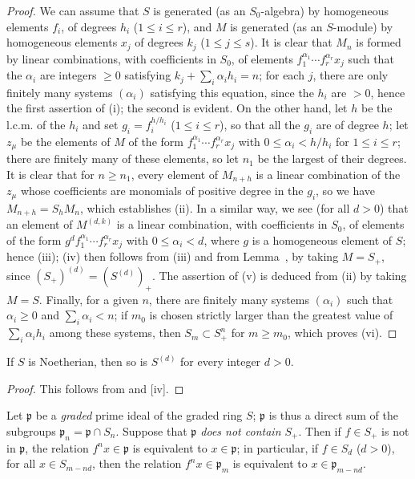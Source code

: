 \begin{proof}
We can assume that $S$ is generated (as an $S_0$-algebra) by homogeneous elements $f_i$, of degrees $h_i$ ($1\leq i\leq r$), and $M$ is generated (as an $S$-module) by homogeneous elements $x_j$ of degrees $k_j$ ($1\leq j\leq s$).
It is clear that $M_n$ is formed by linear combinations,
with coefficients in $S_0$, of elements $f_1^{\alpha_1}\cdots f_r^{\alpha_r}x_j$ such that the $\alpha_i$ are integers $\geq 0$ satisfying $k_j+\sum_i\alpha_i h_i=n$;
for each $j$, there are only finitely many systems $(\alpha_i)$ satisfying this equation, since the $h_i$ are $>0$, hence the first assertion of (i);
the second is evident.
On the other hand, let $h$ be the l.c.m. of the $h_i$ and set $g_i=f_i^{h/h_i}$ ($1\leq i\leq r$), so that all the $g_i$ are of degree $h$;
let $z_\mu$ be the elements of $M$ of the form $f_1^{\alpha_1}\cdots f_r^{\alpha_r}x_j$ with $0\leq\alpha_i<h/h_i$ for $1\leq i\leq r$;
there are finitely many of these elements, so let $n_1$ be the largest of their degrees.
It is clear that for $n\geq n_1$, every element of $M_{n+h}$ is a linear combination of the $z_\mu$ whose coefficients are monomials of positive degree in the $g_i$, so we have $M_{n+h}=S_h M_n$, which establishes (ii).
In a similar way, we see (for all $d>0$) that an element of $M^{(d,k)}$ is a linear combination, with coefficients in $S_0$, of elements of the form $g^d f_1^{\alpha_1}\cdots f_r^{\alpha_r}x_j$ with $0\leq\alpha_i<d$, where $g$ is a homogeneous element of $S$;
hence (iii);
(iv) then follows from (iii) and from Lemma~, by taking $M=S_+$, since $(S_+)^{(d)}=(S^{(d)})_+$.
The assertion of (v) is deduced from (ii) by taking $M=S$.
Finally, for a given $n$, there are finitely many systems $(\alpha_i)$ such that $\alpha_i\geq 0$ and $\sum_i\alpha_i<n$; if $m_0$ is chosen strictly larger than the greatest value of $\sum_i\alpha_i h_i$ among these systems, then $S_m\subset S_+^n$ for $m\geq m_0$, which proves (vi).
\end{proof}

\begin{corollary}[2.1.7]
\label{II.2.1.7}
If $S$ is Noetherian, then so is $S^{(d)}$ for every integer $d>0$.
\end{corollary}

\begin{proof}
This follows from  and [iv].
\end{proof}

\begin{env}[2.1.8]
\label{II.2.1.8}
Let $\mathfrak{p}$ be a \emph{graded} prime ideal of the graded ring $S$;
$\mathfrak{p}$ is thus a direct sum of the subgroups $\mathfrak{p}_n=\mathfrak{p}\cap S_n$.
Suppose that \emph{$\mathfrak{p}$ does not contain $S_+$}.
Then if $f\in S_+$ is not in $\mathfrak{p}$, the relation $f^n x\in\mathfrak{p}$ is equivalent to $x\in\mathfrak{p}$;
in particular, if $f\in S_d$ ($d>0$), for all $x\in S_{m-nd}$, then the relation $f^n x\in\mathfrak{p}_m$ is equivalent to $x\in\mathfrak{p}_{m-nd}$.
\end{env}

